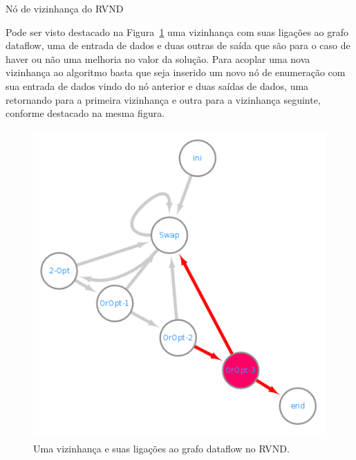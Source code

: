 \begin{algorithm}[htpb]
\caption{Nó de vizinhança do RVND}
\label{alg:rvndOper}
\begin{algorithmic}[1]
    \EndFunction
\end{algorithmic}
\end{algorithm}

Pode ser visto destacado na Figura~\ref{fig:rvndGraphDestacado} uma vizinhança com suas ligações ao grafo dataflow, uma de entrada de dados e duas outras de saída que são para o caso de haver ou não uma melhoria no valor da solução.
Para acoplar uma nova vizinhança ao algoritmo basta que seja inserido um novo nó de enumeração com sua entrada de dados vindo do nó anterior e duas saídas de dados, uma retornando para a primeira vizinhança e outra para a vizinhança seguinte, conforme destacado na mesma figura.

\begin{figure}[htbp]
    \centerline{\includegraphics[scale=0.5]{figuras/rvnd/RVND_dataflow_nomesDestacado.png}}
    \caption{Uma vizinhança e suas ligações ao grafo dataflow no RVND.}
    \label{fig:rvndGraphDestacado}
\end{figure}

